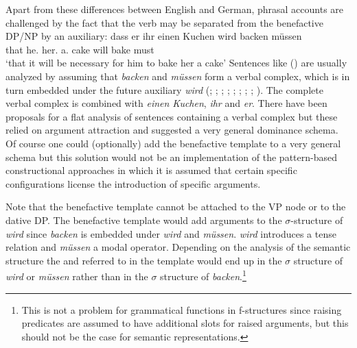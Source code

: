 Apart from these differences between English and German, phrasal accounts are challenged by the fact that the verb may be separated from the benefactive DP/NP by an auxiliary:
\ea
\label{ex-wird-backen-muessen}
\gll dass er ihr einen Kuchen wird backen müssen\\
     that he.\nom{} her.\dat{} a.\acc{} cake       will bake   must\\
\glt `that it will be necessary for him to bake her a cake'
\z
Sentences like () are usually analyzed by assuming that \emph{backen} and \emph{müssen} form
a verbal complex, which is in turn embedded under the future auxiliary \emph{wird}
(\citealt{Bech55a}; \citealt{HN89a,HN94a}; \citealp{Haider90a}; \citealt{Kiss95a};
\citealt{Meurers99a}; \citealt{Kathol2001a}; \citealt{Mueller99a,Mueller2002b};
\citealt[Section~3.2.4]{Berman2003a}; \citealt{FR2009a-u}). The complete
verbal complex is combined with \emph{einen Kuchen}, \emph{ihr} and \emph{er}. There have been
proposals for a flat analysis of sentences containing a verbal complex \citep{BvN98} but these
relied on argument attraction and suggested a very general dominance schema. Of course one could (optionally) add
the benefactive template to a very general schema but this solution would not be an implementation
of the pattern-based constructional approaches in which it is assumed that certain specific
configurations license the introduction of specific arguments.

Note that the benefactive template cannot be attached to the VP node or to the dative DP. The benefactive template
would add arguments to the $\sigma$-structure of \emph{wird} since \emph{backen} is embedded under
\emph{wird} and \emph{müssen}. \emph{wird} introduces a tense relation and \emph{müssen} a modal
operator. Depending on the analysis of the semantic structure the \argtwo and \argthree referred to
in the  template would end up in the $\sigma$ structure of \emph{wird} or
\emph{müssen} rather than in the $\sigma$ structure of \emph{backen}.\footnote{%
  This is not a problem for grammatical functions in f-structures  since raising predicates are assumed to have
  additional slots for raised arguments, but this should not be the case for semantic
  representations.
}


